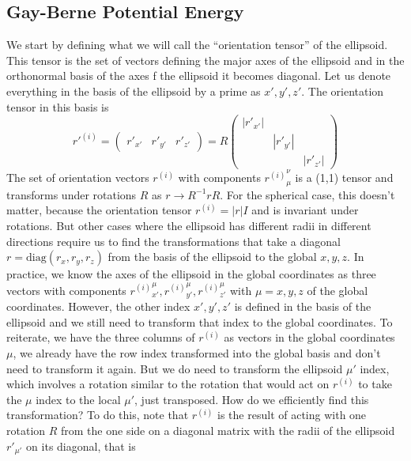 \documentclass[nofootinbib,preprint,floatfix,titlepage,superscriptaddress]{revtex4} %
\begin{document}
\subsection{Gay-Berne Potential Energy }
We start by defining what we will call the ``orientation tensor'' of the ellipsoid. 
This tensor is the set of vectors defining the major axes of the ellipsoid and in the orthonormal basis of the axes f the ellipsoid it becomes diagonal. Let us denote everything in the basis of the ellipsoid by a prime as $x',y',z'$. The orientation tensor in this basis is  
\begin{equation}
    {r'}^{(i)} = \left(\begin{array}{c|c|c}r'_{x'} & r'_{y'} &r'_{z'}\end{array}
    \right) = R \begin{pmatrix}
    |r'_{x'}| \\ 
    & |r'_{y'}|\\ 
    & &|r'_{z'}|
    \end{pmatrix}
    \label{eq:ell}
\end{equation}
The set of orientation vectors $r^{(i)}$ with components ${r^{(i)}}_{\mu}^\nu$ is a (1,1) tensor and transforms under rotations $R$ as $r \to R^{-1} r R$. 
For the spherical case, this doesn't matter, because the orientation tensor $r^{(i)} = |r|I$ and is invariant under rotations. 
But other cases where the ellipsoid has different radii in different directions require us to find the transformations that take a diagonal $r = \mathrm{diag}(r_x,r_y,r_z)$ from the basis of the ellipsoid to the global $x,y,z$. 
In practice, we know the axes of the ellipsoid in the global coordinates as three vectors with components  ${r^{(i)}}_{x'}^\mu, {r^{(i)}}_{y'}^\mu, {r^{(i)}}_{z'}^\mu$ with $\mu = x,y,z$ of the global coordinates. However, the other index $x',y',z'$ is defined in the basis of the ellipsoid and we still need to transform that index to the global coordinates.  
To reiterate,  we have the three columns of $r^{(i)}$ as vectors in the global coordinates $\mu$, we already have the row index transformed into the global basis and don't need to transform it again. 
But we do need to transform the ellipsoid $\mu'$ index, which involves a rotation similar to the rotation that would act on $r^{(i)}$ to take the $\mu$ index to the local $\mu'$, just transposed. 
How do we efficiently find this transformation? 
To do this, note that $r^{(i)}$ is the result of acting with one rotation $R$ from the one side on a diagonal matrix with the radii of the ellipsoid $r'_{\mu'}$ on its diagonal, that is
\end{document}
